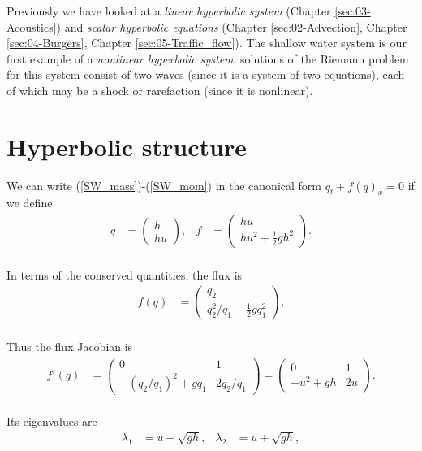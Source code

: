 \documentclass{SIAMbook2016}
\begin{document}
Previously we have looked at a \emph{linear hyperbolic system}
(Chapter \ref{sec:03-Acoustics}) and \emph{scalar hyperbolic equations}
(Chapter \ref{sec:02-Advection}, Chapter \ref{sec:04-Burgers},
Chapter \ref{sec:05-Traffic_flow}). The shallow water system is our
first example of a \emph{nonlinear hyperbolic system}; solutions of the
Riemann problem for this system consist of two waves (since it is a
system of two equations), each of which may be a shock or rarefaction
(since it is nonlinear).

\hypertarget{hyperbolic-structure}{%
\section{Hyperbolic structure}\label{hyperbolic-structure}}

We can write (\ref{SW_mass})-(\ref{SW_mom}) in the canonical form
\(q_t + f(q)_x = 0\) if we define\\
\begin{align}
q & = \begin{pmatrix} h \\ hu \end{pmatrix}, & f & = \begin{pmatrix} hu \\ hu^2 + \frac{1}{2}gh^2 \end{pmatrix}.
\end{align}\\
In terms of the conserved quantities, the flux is\\
\begin{align}
f(q) & = \begin{pmatrix} q_2 \\ q_2^2/q_1 + \frac{1}{2}g q_1^2 \end{pmatrix}.
\end{align}\\
Thus the flux Jacobian is\\
\begin{align}
f'(q) & = \begin{pmatrix} 0 & 1 \\ -(q_2/q_1)^2 + g q_1 & 2 q_2/q_1 \end{pmatrix} 
        = \begin{pmatrix} 0 & 1 \\ -u^2 + g h & 2 u \end{pmatrix}.
\end{align}\\
Its eigenvalues are\\
\begin{align} \label{SW:char-speeds}
    \lambda_1 & = u - \sqrt{gh}, & \lambda_2 & = u + \sqrt{gh},
\end{align}\\
\end{document}
